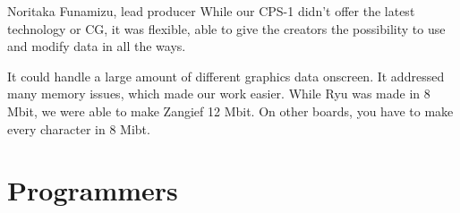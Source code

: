 \pagebreak

\pagebreak

\pagebreak

\pagebreak

\pagebreak



\begin{q}{Noritaka Funamizu, lead producer\cite{retro}}
  While our CPS-1 didn't offer the latest technology or CG, it was flexible, able to give the creators the possibility to use and modify data in all the ways.


  It could handle a large amount of different graphics data onscreen. It addressed many memory issues, which made our work easier. While Ryu was made in 8 Mbit, we were able to make Zangief 12 Mbit. On other boards, you have to make every character in 8 Mibt.
  \end{q}

\section{Programmers}






